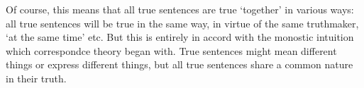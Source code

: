 Of course, this means that all true sentences are true `together' in various ways: all true sentences will be true in the same way, in virtue of the same truthmaker, `at the same time' etc.
But this is entirely in accord with the monostic intuition which correspondce theory began with.
True sentences might mean different things or express different things, but all true sentences share a common nature in their truth.





